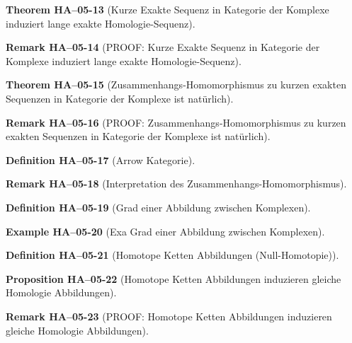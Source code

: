 \documentclass[10pt, letterpaper]{article}
\newcommand{\CustomHeading}[3]{%
  \par\medskip\noindent%
  \textbf{#1 #2} \textnormal{(#3)}.\enskip%
}
\newenvironment{DEF}[2]{\CustomHeading{Definition}{#1}{#2}}{}
\newenvironment{PROP}[2]{\CustomHeading{Proposition}{#1}{#2}}{}
\newenvironment{THEO}[2]{\CustomHeading{Theorem}{#1}{#2}}{}
\newenvironment{REM}[2]{\CustomHeading{Remark}{#1}{#2}}{}
\newenvironment{EXA}[2]{\CustomHeading{Example}{#1}{#2}}{}
\begin{document}
\begin{THEO}{HA--05-13}{Kurze Exakte Sequenz in Kategorie der Komplexe induziert lange exakte Homologie-Sequenz}
\end{THEO}

\begin{REM}{HA--05-14}{PROOF: Kurze Exakte Sequenz in Kategorie der Komplexe induziert lange exakte Homologie-Sequenz}
\end{REM}

\begin{THEO}{HA--05-15}{Zusammenhangs-Homomorphismus zu kurzen exakten Sequenzen in Kategorie der Komplexe ist natürlich}
\end{THEO}

\begin{REM}{HA--05-16}{PROOF: Zusammenhangs-Homomorphismus zu kurzen exakten Sequenzen in Kategorie der Komplexe ist natürlich}
\end{REM}

\begin{DEF}{HA--05-17}{Arrow Kategorie}
\end{DEF}

\begin{REM}{HA--05-18}{Interpretation des Zusammenhangs-Homomorphismus}
\end{REM}

\begin{DEF}{HA--05-19}{Grad einer Abbildung zwischen Komplexen}
\end{DEF}

\begin{EXA}{HA--05-20}{Exa Grad einer Abbildung zwischen Komplexen}
\end{EXA}

\begin{DEF}{HA--05-21}{Homotope Ketten Abbildungen (Null-Homotopie)}
\end{DEF}

\begin{PROP}{HA--05-22}{Homotope Ketten Abbildungen induzieren gleiche Homologie Abbildungen}
\end{PROP}

\begin{REM}{HA--05-23}{PROOF: Homotope Ketten Abbildungen induzieren gleiche Homologie Abbildungen}
\end{REM}
\end{document}
